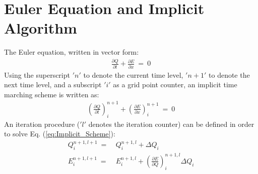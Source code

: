 \documentclass[conf]{new-aiaa}
\begin{document}
\section{Euler Equation and Implicit Algorithm}
\label{sec:Euler}
The Euler equation, written in vector form:
\begin{equation}
	\begin{split}
		\label{eq:NS}
  			\frac{\partial{Q}}{\partial{t}} + \frac{\partial{E}}{\partial{x}}~=~0
	\end{split}
\end{equation}
Using the superscript $' n'$ to denote the current time level, $ 'n+1'$ to denote the next time level, and a subscript $' i'$ as a grid point counter, an implicit time marching scheme is written as:
\begin{equation}
	\begin{split}
		\label{eq:Implicit_Scheme}
  			\left(\frac{\partial{Q}}{\partial{t}}\right)_{i}^{n+1} +\left(\frac{\partial{E}}{\partial{x}}\right)_{i}^{n+1}~=~0
	\end{split}
\end{equation}
An iteration procedure ($' l'$ denotes the iteration counter) can be defined in order to solve Eq. (\ref{eq:Implicit_Scheme}):
\begin{equation}
	\label{eq:TS_Q_E}
	\begin{split}
	Q_i^{n+1, l+1}~=&~Q_i^{n+1, l}+\Delta{Q}_i \\
	E_i^{n+1, l+1}~=&~E_i^{n+1, l} + \left(\frac{\partial{E}}{\partial{Q}} \right)^{n+1, l}_i\Delta{Q}_i
	\end{split}
\end{equation}
\end{document}
